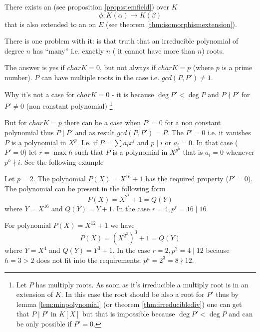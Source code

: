 There exists an  (see proposition
\ref{prop:stemfield}) over $K$
\[
\phi: K\left(\alpha\right) \to K\left(\beta\right)
\]
that is also extended to an  on $E$
(see theorem \ref{thm:isomorphismextension}).

There is one problem with it: is that truth that an irreducible
polynomial of degree $n$ has ``many'' i.e. exactly $n$ ( it cannot
have more than $n$) roots.

The answer is yes if $char K = 0$, but not always if $char K = p$
(where $p$ is a prime number). $P$ can have multiple roots in the case
i.e. $gcd(P, P') \ne 1$.

Why it's not a case for $char K = 0$ - it is because
$\deg P' < \deg P$ and $P \nmid P'$ for $P' \ne 0$ (non constant
polynomial)
\footnote{
  Let $P$ has multiply roots. As soon as it's irreducible a multiply
  root is in an extension of $K$. In this case the root should be also
  a root for $P'$ thus by lemma \ref{lem:minpolynomial} (or
  theorem \ref{thm:irreduciblediv}) one can get
  that $P \mid P'$ in $K\left[X\right]$ but that is impossible because
  $\deg P' < \deg P$ and can be only possible if $P' = 0$.
}

But for $char K = p$ there can be a case when $P' = 0$ for a non
constant polynomial thus $P \mid P'$ and as result $gcd(P, P') = P$.
The $P' = 0$ i.e. it vanishes $P$ is a polynomial in $X^p$. I.e. if
$P = \sum a_i x^i$ and $p \mid i$ or $a_i = 0$. In that case ($P' =
0$) let $r = \max h$ such that $P$ is a polynomial in $X^{p^h}$ that
is $a_i = 0$ whenever $p^h \nmid i$. See the following example
\begin{myexample}
  Let $p = 2$. The polynomial $P\left(X\right) = X^{16} + 1$ has the
  required property ($P' = 0$). The polynomial can be present in the
  following form
  \[
  P\left(X\right) = X^{2^4} + 1 = Q(Y)
  \]
  where $Y = X^{16}$ and $Q(Y) = Y + 1$. In the case
  $r=4, p^r = 16 \mid 16$

  For polynomial $P\left(X\right) = X^{12} + 1$ we have
  \[
  P\left(X\right) = \left(X^{2^2}\right)^3 + 1 = Q(Y)
  \]
  where $Y = X^4$ and $Q(Y) = Y^3 + 1$. In the case
  $r=2, p^2 = 4 \mid 12$ because $h = 3 > 2$ does not fit into
  the requirements: $p^h = 2^3 = 8 \nmid 12$.
\end{myexample}

